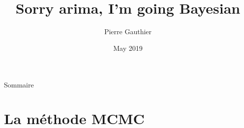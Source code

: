 \documentclass{presentation_template}
\author{Pierre Gauthier}
\title[Sorry ARIMA]{Sorry arima, I'm going Bayesian}
\institute[]{{\'Ecole des Mines de Nancy}}
\date{May 2019}
\begin{document}
{

}





\begin{frame}{Sommaire}
\tableofcontents
\end{frame}

\section{La méthode MCMC}
%
\end{document}
